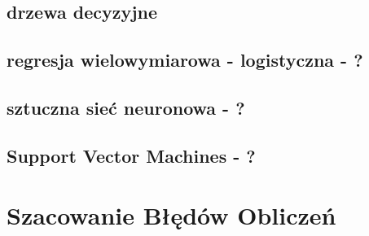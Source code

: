 \documentclass[12pt,a4paper]{report}
\begin{document}
\subsection{drzewa decyzyjne}
\subsection{regresja wielowymiarowa - logistyczna - ?}
\subsection{sztuczna sieć neuronowa - ?}
\subsection{Support Vector Machines - ?}
\section{Szacowanie Błędów Obliczeń}
\end{document}
